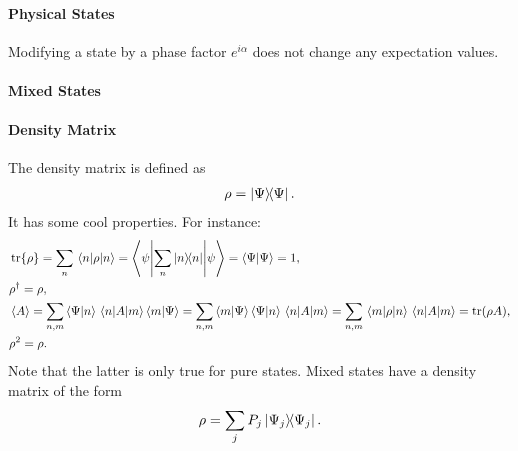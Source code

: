 \paragraph{Physical States}
Modifying a state by a phase factor $e^{i\alpha}$ does not change any expectation values.

\paragraph{Mixed States}

\paragraph{Density Matrix}
The density matrix is defined as
\begin{align*}
	\rho = \op{\Psi}{\Psi}.
\end{align*}
It has some cool properties. For instance:
\begin{align*}
	&\tr{\rho} = \sum\limits_{n}\expval{\rho}{n} = \ev**{\sum\limits_{n}\op{n}{n}}{\psi} = \braket{\Psi} = 1, \\
	&\adj{\rho} = \rho, \\
	&\expval{A} = \sum\limits_{n, m}\braket{\Psi}{n}\mel{n}{A}{m}\braket{m}{\Psi} = \sum\limits_{n, m}\braket{m}{\Psi}\braket{\Psi}{n}\mel{n}{A}{m} = \sum\limits_{n, m}\mel{m}{\rho}{n}\mel{n}{A}{m} = \tr(\rho A), \\
	&\rho^{2} = \rho.
\end{align*}
Note that the latter is only true for pure states. Mixed states have a density matrix of the form
\begin{align*}
	\rho = \sum\limits_{j}P_{j}\op{\Psi_{j}}{\Psi_{j}}.
\end{align*}